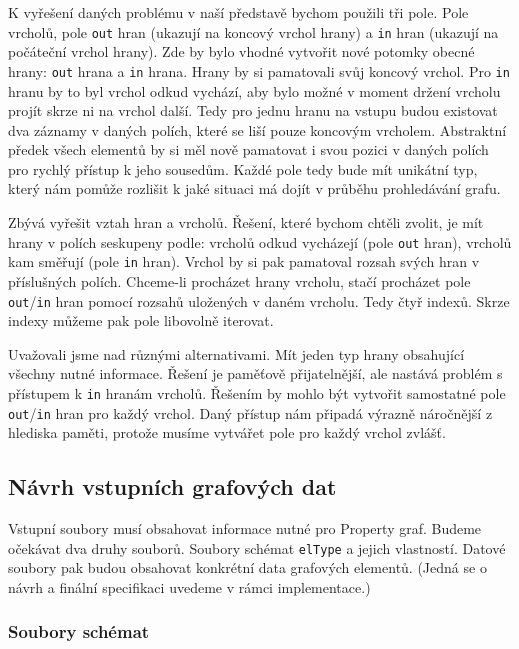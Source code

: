 K vyřešení daných problému v naší představě bychom použili tři pole.
Pole vrcholů, pole \texttt{out} hran (ukazují na koncový vrchol hrany) a \texttt{in} hran (ukazují na počáteční vrchol hrany). 
Zde by bylo vhodné vytvořit nové potomky obecné hrany: \texttt{out} hrana a \texttt{in} hrana.
Hrany by si pamatovali svůj koncový vrchol.
Pro \texttt{in} hranu by to byl vrchol odkud vychází, aby bylo možné v moment držení vrcholu projít skrze ni na vrchol další.
Tedy pro jednu hranu na vstupu budou existovat dva záznamy v daných polích, které se liší pouze koncovým vrcholem.
Abstraktní předek všech elementů by si měl nově pamatovat i svou pozici v daných polích pro rychlý přístup k jeho sousedům.
Každé pole tedy bude mít unikátní typ, který nám pomůže rozlišit k jaké situaci má dojít v průběhu prohledávání grafu.

Zbývá vyřešit vztah hran a vrcholů.
Řešení, které bychom chtěli zvolit, je mít hrany v polích seskupeny podle: vrcholů odkud vycházejí (pole \texttt{out} hran), vrcholů kam směřují (pole \texttt{in} hran).
Vrchol by si pak pamatoval rozsah svých hran v příslušných polích. 
Chceme-li procházet hrany vrcholu, stačí procházet pole \texttt{out}/\texttt{in} hran pomocí rozsahů uložených v daném vrcholu.
Tedy čtyř indexů.
Skrze indexy můžeme pak pole libovolně iterovat.

Uvažovali jsme nad různými alternativami. 
Mít jeden typ hrany obsahující všechny nutné informace.
Řešení je paměťově přijatelnější, ale nastává problém s přístupem k \texttt{in} hranám vrcholů.
Řešením by mohlo být vytvořit samostatné pole \texttt{out}/\texttt{in} hran pro každý vrchol. 
Daný přístup nám připadá výrazně náročnější z hlediska paměti, protože musíme vytvářet pole pro každý vrchol zvlášť. 

\subsection{Návrh vstupních grafových dat} \label{anal.vstup}

Vstupní soubory musí obsahovat informace nutné pro Property graf.
Budeme očekávat dva druhy souborů.
Soubory schémat \texttt{elType} a jejich vlastností.
Datové soubory pak budou obsahovat konkrétní data grafových elementů.
(Jedná se o návrh a finální specifikaci uvedeme v rámci implementace.)

\subsubsection{Soubory schémat} 


